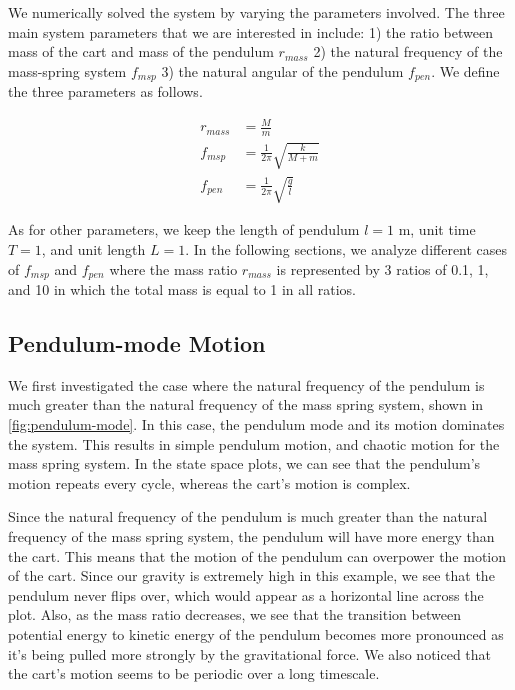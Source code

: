 \documentclass[12pt]{article}
\begin{document}
We numerically solved the system by varying the parameters involved. The three main system parameters that we are interested in include: 1) the ratio between mass of the cart and mass of the pendulum $r_{mass}$ 2) the natural frequency of the mass-spring system $f_{msp}$ 3) the natural angular of the pendulum $f_{pen}$. We define the three parameters as follows.

\begin{align}
    r_{mass} &= \frac{M}{m} \\
    f_{msp} &= \frac{1}{2\pi}\sqrt{\frac{k}{M+m}} \\
    f_{pen} &= \frac{1}{2\pi}\sqrt{\frac{g}{l}}
\end{align}

As for other parameters, we keep the length of pendulum $l = 1$ m, unit time $T = 1$, and unit length $L = 1$. In the following sections, we analyze different cases of $f_{msp}$ and $f_{pen}$ where the mass ratio $r_{mass}$ is represented by 3 ratios of 0.1, 1, and 10 in which the total mass is equal to 1 in all ratios.

\subsection{Pendulum-mode Motion}

We first investigated the case where the natural frequency of the pendulum is much greater than the natural frequency of the mass spring system, shown in \autoref{fig:pendulum-mode}. In this case, the pendulum mode and its motion dominates the system. This results in simple pendulum motion, and chaotic motion for the mass spring system. In the state space plots, we can see that the pendulum's motion repeats every cycle, whereas the cart's motion is complex.

Since the natural frequency of the pendulum is much greater than the natural frequency of the mass spring system, the pendulum will have more energy than the cart. This means that the motion of the pendulum can overpower the motion of the cart. Since our gravity is extremely high in this example, we see that the pendulum never flips over, which would appear as a horizontal line across the plot. Also, as the mass ratio decreases, we see that the transition between potential energy to kinetic energy of the pendulum becomes more pronounced as it's being pulled more strongly by the gravitational force. We also noticed that the cart's motion seems to be periodic over a long timescale.
\end{document}
